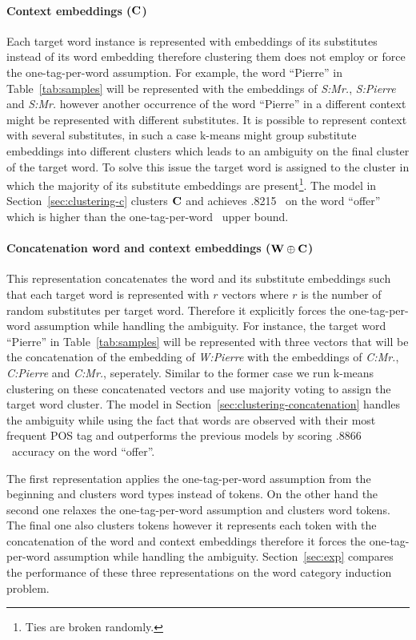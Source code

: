 \paragraph{Context embeddings (${\bf C}$)} 
Each target word instance is represented with embeddings of its
substitutes instead of its word embedding therefore clustering them
does not employ or force the one-tag-per-word assumption.  For
example, the word ``Pierre'' in Table~\ref{tab:samples} will be
represented with the embeddings of {\it S:Mr.}, {\it S:Pierre} and
{\it S:Mr.}  however another occurrence of the word ``Pierre'' in a
different context might be represented with different substitutes.  It
is possible to represent context with several substitutes, in such a
case k-means might group substitute embeddings into different clusters
which leads to an ambiguity on the final cluster of the target word.
To solve this issue the target word is assigned to the cluster in
which the majority of its substitute embeddings are
present\footnote{Ties are broken randomly.}.  The model in
Section~\ref{sec:clustering-c} clusters ${\bf C}$ and achieves .8215
\mto\ on the word ``offer'' which is higher than the one-tag-per-word
\mto\ upper bound.

\paragraph{Concatenation word and context embeddings (${\bf W\oplus C}$)} 
This representation concatenates the word and its substitute
embeddings such that each target word is represented with $r$ vectors
where $r$ is the number of random substitutes per target word.
Therefore it explicitly forces the one-tag-per-word assumption while
handling the ambiguity.  For instance, the target word ``Pierre'' in
Table~\ref{tab:samples} will be represented with three vectors that
will be the concatenation of the embedding of {\it W:Pierre} with the
embeddings of {\it C:Mr.}, {\it C:Pierre} and {\it C:Mr.}, seperately.
Similar to the former case we run k-means clustering on these
concatenated vectors and use majority voting to assign the target word
cluster.  The model in Section~\ref{sec:clustering-concatenation}
handles the ambiguity while using the fact that words are observed
with their most frequent POS tag and outperforms the previous models
by scoring .8866 \mto\ accuracy on the word ``offer''.

The first representation applies the one-tag-per-word assumption from
the beginning and clusters word types instead of tokens.  On the other
hand the second one relaxes the one-tag-per-word assumption and
clusters word tokens.  The final one also clusters tokens however it
represents each token with the concatenation of the word and context
embeddings therefore it forces the one-tag-per-word assumption while
handling the ambiguity.  Section~\ref{sec:exp} compares the
performance of these three representations on the word category
induction problem.
